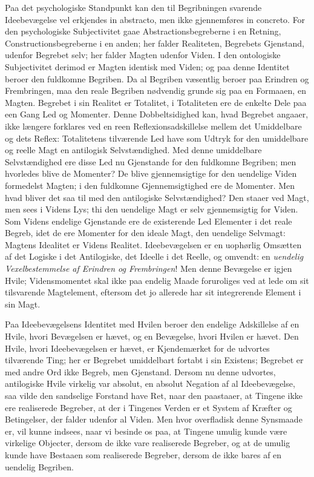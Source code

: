 \documentclass[12pt]{book}
\newcommand{\opage}[1]{\marginnote{\footnotesize\textit{[#1]}}}
\begin{document}
Paa det psychologiske Standpunkt kan den til Begribningen svarende Ideebevægelse vel erkjendes
in abstracto, men ikke gjennemføres in concreto. For den psychologiske Subjectivitet gaae
Abstractionsbegreberne i en Retning, Constructionsbegreberne i en anden; her falder Realiteten,
Begrebets Gjenstand, udenfor Begrebet selv; her falder Magten udenfor Viden. I den ontologiske
Subjectivitet derimod er Magten identisk med Viden; og paa denne Identitet beroer den fuldkomne
Begriben. Da al Begriben væsentlig beroer paa Erindren og Frembringen, maa den reale Begriben
nødvendig grunde sig paa en Formaaen, en Magten. Begrebet i sin Realitet er Totalitet, i
Totaliteten ere de enkelte Dele paa een Gang Led og Momenter. Denne Dobbeltsidighed kan, hvad
Begrebet angaaer, ikke længere forklares ved en reen Reflexionsadskillelse mellem det
Umiddelbare og dets Reflex: Totalitetens tilværende Led have som Udtryk for den umiddelbare og
reelle Magt en antilogisk Selvstændighed. Med denne umiddelbare Selvstændighed ere disse Led nu
Gjenstande for den fuldkomne Begriben; men hvorledes blive de Momenter? De blive gjennemsigtige
for den uendelige Viden formedelst Magten; i den fuldkomne Gjennemsigtighed ere de Momenter. Men
hvad bliver det saa til med den antilogiske Selvstændighed? Den staaer ved Magt, men sees i
Videns Lys; thi den uendelige Magt er selv gjennemsigtig for Viden. Som
\opage{171} Videns endelige Gjenstande ere de existerende Led Elementer i det reale Begreb, idet de ere
Momenter for den ideale Magt, den uendelige Selvmagt: Magtens Idealitet er Videns Realitet.
Ideebevægelsen er en uophørlig Omsætten af det Logiske i det Antilogiske, det Ideelle i det
Reelle, og omvendt: en \emph{uendelig Vexelbestemmelse af Erindren og Frembringen}! Men denne
Bevægelse er igjen Hvile; Vidensmomentet skal ikke paa endelig Maade foruroliges ved at lede om
sit tilsvarende Magtelement, eftersom det jo allerede har sit integrerende Element i sin Magt.

Paa Ideebevægelsens Identitet med Hvilen beroer den endelige Adskillelse af en Hvile, hvori
Bevægelsen er hævet, og en Bevægelse, hvori Hvilen er hævet. Den Hvile, hvori Ideebevægelsen er
hævet, er Kjendemærket for de udvortes tilværende Ting; her er Begrebet umiddelbart fortabt i
sin Existens; Begrebet er med andre Ord ikke Begreb, men Gjenstand. Dersom nu denne udvortes,
antilogiske Hvile virkelig var absolut, en absolut Negation af al Ideebevægelse, saa vilde den
sandselige Forstand have Ret, naar den paastaaer, at Tingene ikke ere realiserede Begreber, at
der i Tingenes Verden er et System af Kræfter og Betingelser, der falder udenfor al Viden. Men
hvor overfladisk denne Synsmaade er, vil kunne indsees, naar vi besinde os paa, at Tingene
umulig kunde være virkelige Objecter, dersom de ikke vare realiserede Begreber, og at de umulig
kunde have Bestaaen som realiserede Begreber, dersom de ikke bares af en uendelig Begriben.
\end{document}
